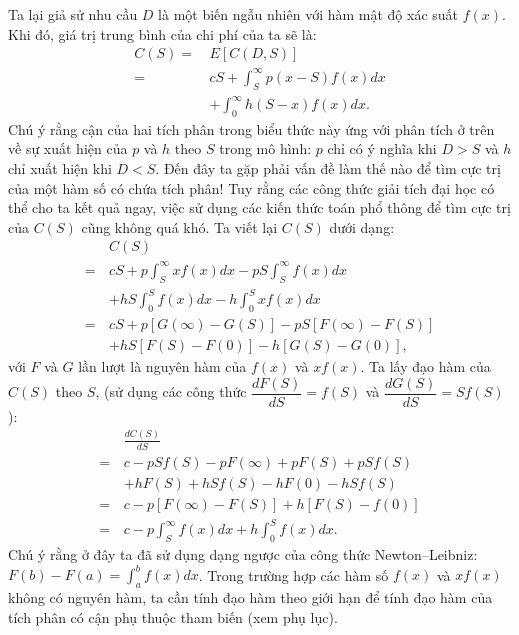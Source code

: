 \begin{multicols}{2}
	\vskip 0.1cm
	Ta lại giả sử nhu cầu $D$ là một biến ngẫu nhiên với hàm mật độ xác suất $f(x)$. Khi đó, giá trị trung bình của chi phí của ta sẽ là:
	\begin{align*}
		C(S) =\,& E\left[C(D,S)\right] \\
			=\,& cS + \int_S^\infty  {p(x - S)f(x)dx} \\
			&+ \int_0^\infty  {h(S - x)f(x)dx.} 
	\end{align*}
	Chú ý rằng cận của hai tích phân trong biểu thức này ứng với phân tích ở trên về sự xuất hiện của $p$ và $h$ theo $S$ trong mô hình: $p$ chỉ có ý nghĩa khi $D>S$ và $h$ chỉ xuất hiện khi $D<S$.
	\vskip 0.2cm
	\vskip 0.2cm
	Đến đây ta gặp phải vấn đề làm thế nào để tìm cực trị của một hàm số có chứa tích phân! Tuy rằng các công thức giải tích đại học có thể cho ta kết quả ngay, việc sử dụng các kiến thức toán phổ thông để tìm cực trị của $C(S)$ cũng không quá khó. Ta viết lại $C(S)$ dưới dạng:
	\begin{align*}
		&C(S) \\
		= \,&cS + p\int_S^{\infty}{xf(x)dx} - pS\int_S^{\infty}{f(x)dx}\\
		 &+ hS\int_0^{S}{f(x)dx} - h\int_0^{S}{xf(x)dx}\\
		= \,&cS \!+\! p\left[G(\infty) \!-\! G(S)\right] \!-\! pS\left[F(\infty) \!-\! F(S)\right]\\
		&+ hS\left[F(S) - F(0)\right] - h\left[G(S) - G(0)\right],
	\end{align*}
	với $F$ và $G$ lần lượt là nguyên hàm của $f(x)$ và $xf(x)$.
	\vskip 0.1cm
	Ta lấy đạo hàm của $C(S)$ theo $S$, (sử dụng các công thức $\dfrac{dF(S)}{dS} = f(S)$ và $\dfrac{dG(S)}{dS} = Sf(S)$):
	\begin{align*}
		&\frac{dC(S)}{dS} \\
		= \,&c - pSf(S) - pF(\infty) + pF(S) + pSf(S) \\
		&+ hF(S) + hSf(S) - hF(0) - hSf(S)\\
		= \,&c- p\left[F(\infty) - F(S)\right] + h\left[F(S) - f(0)\right]\\
		= \,&c- p\int_S^{\infty}{f(x)dx} + h\int_0^{S}{f(x)dx}.
	\end{align*}
	Chú ý rằng ở đây ta đã sử dụng dạng ngược của công thức Newton--Leibniz: $F(b)-F(a)= \int_a^b{f(x)dx}$. Trong trường hợp các hàm số $f(x)$ và $xf(x)$ không có nguyên hàm, ta cần tính đạo hàm theo giới hạn để tính đạo hàm của tích phân có cận phụ thuộc tham biến (xem phụ lục).

\end{multicols}
